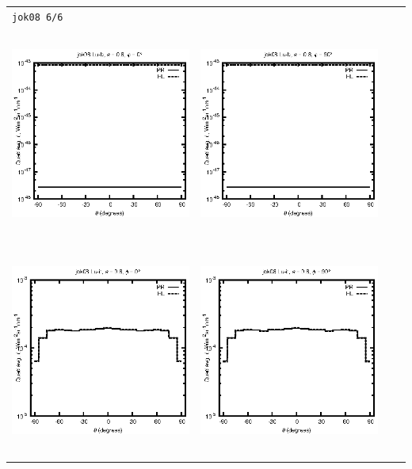 \documentclass[10pt,a4paper]{article}
\begin{document}
\begin{adjustwidth}{-1.2in}{-1.2in}
\begin{tabular}{c c c c}
\multicolumn{4}{l}{\texttt{jok08 6/6}} \\
\includegraphics[height=7cm]{../eps/jok08_Lu_b_fwd.eps} &
\includegraphics[height=7cm]{../eps/jok08_Lu_b_cross.eps} \\
\includegraphics[height=7cm]{../eps/jok08_Lu_it_fwd.eps} &
\includegraphics[height=7cm]{../eps/jok08_Lu_it_cross.eps} \\

\end{tabular}
\end{adjustwidth}
\end{document}
